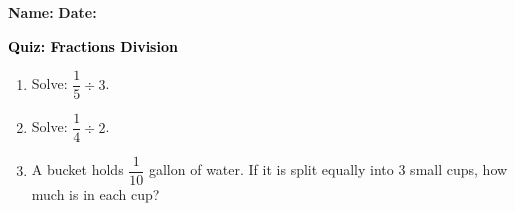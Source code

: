 \documentclass[12pt, letterpaper, fleqn]{article}
\begin{document}
\textbf{Name:} \underline{\hspace{5cm}}
\hfill
\textbf{Date:} \underline{\hspace{3cm}}\\

\begin{tcolorbox}[colback=customteal!20]
    \large\textcolor{black}{\textbf{Quiz: Fractions Division}}
\end{tcolorbox}
\begin{enumerate}[itemsep=3.5cm, leftmargin=0.6cm]
\item Solve: $\dfrac{1}{5} \div 3$.
\vspace{3.5cm}
\item Solve: $\dfrac{1}{4} \div 2$.
\vspace{3.5cm}
\item A bucket holds $\dfrac{1}{10}$ gallon of water. If it is split equally into 3 small cups, how much is in each cup?
\end{enumerate}
\end{document}
